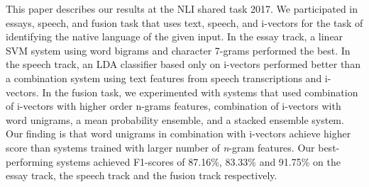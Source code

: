 This paper describes our results at the NLI shared task 2017.  We participated in essays, speech, and fusion task that uses text, speech, and i-vectors for the task of identifying the native language of the given input. In the essay track, a linear SVM system using word bigrams and character 7-grams performed the best. In the speech track, an LDA classifier based only on i-vectors performed better than a combination system using text features from speech transcriptions and i-vectors. In the fusion task, we experimented with systems that used combination of i-vectors with higher order n-grams features, combination of i-vectors with word unigrams, a mean probability ensemble, and a stacked ensemble system. Our finding is that word unigrams in combination with i-vectors achieve higher score than systems trained with larger number of \emph{n}-gram features.  Our best-performing systems achieved F1-scores of 87.16\%, 83.33\% and 91.75\% on the essay track, the speech track and the fusion track respectively.
